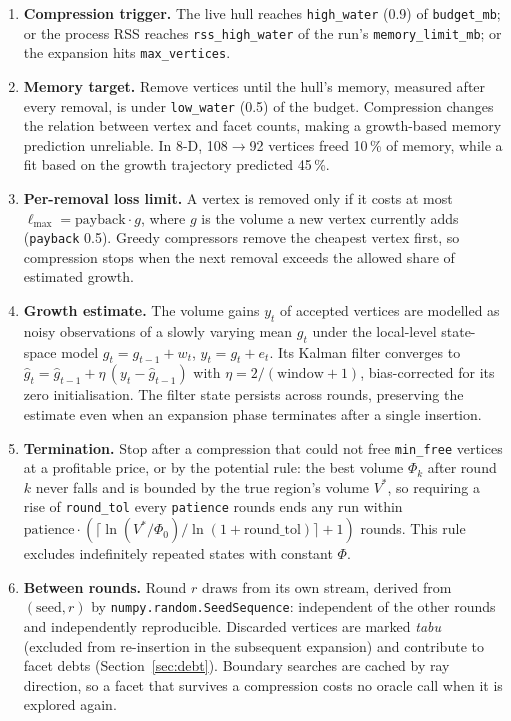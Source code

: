\documentclass[11pt,a4paper]{report}
\newcommand{\code}[1]{\texttt{\small #1}}
\begin{document}
\begin{enumerate}
\item \textbf{Compression trigger.} The live hull reaches \code{high\_water} (0.9) of
  \code{budget\_mb}; or the process RSS reaches \code{rss\_high\_water} of the
  run's \code{memory\_limit\_mb}; or the expansion hits \code{max\_vertices}.
\item \textbf{Memory target.} Remove vertices until the hull's memory,
  measured after every removal, is under \code{low\_water} (0.5) of the budget.
  Compression changes the relation between vertex and facet counts, making a
  growth-based memory prediction unreliable. In 8-D, 108$\to$92 vertices freed
  10\,\% of memory, while a fit based on the growth trajectory predicted 45\,\%.
\item \textbf{Per-removal loss limit.} A vertex is removed only if it costs at most
  $\ell_{\max} = \mathrm{payback}\cdot g$, where $g$ is the volume a new vertex
  currently adds (\code{payback} 0.5). Greedy compressors remove the cheapest
  vertex first, so compression stops when the next removal exceeds the allowed
  share of estimated growth.
\item \textbf{Growth estimate.} The volume gains $y_t$ of accepted vertices
  are modelled as noisy observations of a slowly varying mean $g_t$ under the
  local-level state-space model $g_t = g_{t-1}+w_t$, $y_t = g_t+e_t$. Its
  Kalman filter converges to
  $\hat g_t = \hat g_{t-1} + \eta\,(y_t-\hat g_{t-1})$ with
  $\eta = 2/(\text{window}+1)$, bias-corrected for its zero initialisation. The
  filter state persists across rounds, preserving the estimate even when an
  expansion phase terminates after a single insertion.
\item \textbf{Termination.} Stop after a compression that could not free
  \code{min\_free} vertices at a profitable price, or by the potential rule: the
  best volume $\Phi_k$ after round $k$ never falls and is bounded by the true
  region's volume $V^\ast$, so requiring a rise of \code{round\_tol} every
  \code{patience} rounds ends any run within
  $\mathrm{patience}\cdot(\lceil \ln(V^\ast/\Phi_0)/\ln(1+\mathrm{round\_tol})\rceil+1)$
  rounds. This rule excludes indefinitely repeated states with constant $\Phi$.
\item \textbf{Between rounds.} Round $r$ draws from its own stream, derived from
  $(\text{seed}, r)$ by \code{numpy.random.SeedSequence}: independent of the other
  rounds and independently reproducible. Discarded vertices are marked
  \emph{tabu} (excluded from re-insertion in the subsequent expansion) and
  contribute to facet debts (Section~\ref{sec:debt}). Boundary searches are
  cached by ray direction, so a facet that
  survives a compression costs no oracle call when it is explored again.
\end{enumerate}
\end{document}
